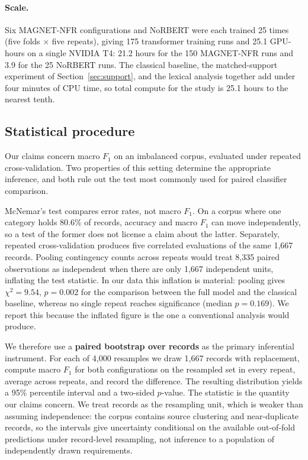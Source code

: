 \documentclass[11pt,a4paper]{article}
\begin{document}
\paragraph{Scale.}
Six MAGNET-NFR configurations and NoRBERT were each trained 25 times (five folds $\times$
five repeats), giving 175 transformer training runs and 25.1 GPU-hours on a single NVIDIA T4:
21.2 hours for the 150 MAGNET-NFR runs and 3.9 for the 25 NoRBERT runs. The classical
baseline, the matched-support experiment of Section~\ref{sec:support}, and the lexical
analysis together add under four minutes of CPU time, so total compute for the study is 25.1
hours to the nearest tenth.

\subsection{Statistical procedure}
\label{sec:stats}

Our claims concern macro $F_1$ on an imbalanced corpus, evaluated under repeated
cross-validation. Two properties of this setting determine the appropriate inference, and
both rule out the test most commonly used for paired classifier comparison.

McNemar's test compares error rates, not macro $F_1$. On a corpus where one category holds
80.6\% of records, accuracy and macro $F_1$ can move independently, so a test of the former
does not license a claim about the latter. Separately, repeated cross-validation produces
five correlated evaluations of the same 1{,}667 records. Pooling contingency counts across
repeats would treat 8{,}335 paired observations as independent when there are only 1{,}667
independent units, inflating the test statistic. In our data this inflation is material:
pooling gives $\chi^2 = 9.54$, $p = 0.002$ for the comparison between the full model and
the classical baseline, whereas no single repeat reaches significance (median
$p = 0.169$). We report this because the inflated figure is the one a conventional analysis
would produce.

We therefore use a \textbf{paired bootstrap over records} as the primary inferential
instrument. For each of 4{,}000 resamples we draw 1{,}667 records with replacement, compute
macro $F_1$ for both configurations on the resampled set in every repeat, average across
repeats, and record the difference. The resulting distribution yields a 95\% percentile
interval and a two-sided $p$-value. The statistic is the quantity our claims concern. We treat records as the resampling unit, which
is weaker than assuming independence: the corpus contains source clustering and near-duplicate
records, so the intervals give uncertainty conditional on the available out-of-fold predictions
under record-level resampling, not inference to a population of independently drawn
requirements.
\end{document}
